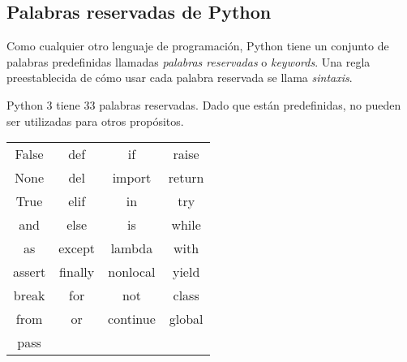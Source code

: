     \subsection{Palabras reservadas de Python}\label{subsubsec: keywords}
    Como cualquier otro lenguaje de programación, Python tiene un conjunto de palabras predefinidas llamadas \emph{palabras reservadas} o \emph{keywords}. Una regla preestablecida de cómo usar cada palabra reservada se llama \emph{sintaxis}.\par 
    Python 3 tiene 33 palabras reservadas. Dado que están predefinidas, no pueden ser utilizadas para otros propósitos. 
    \begin{table}[h]
        \centering
            \begin{tabular}{|c|ccc}
            \hline
            False  & \multicolumn{1}{c|}{def}     & \multicolumn{1}{c|}{if}       & \multicolumn{1}{c|}{raise}  \\
            None   & \multicolumn{1}{c|}{del}     & \multicolumn{1}{c|}{import}   & \multicolumn{1}{c|}{return} \\
            True   & \multicolumn{1}{c|}{elif}    & \multicolumn{1}{c|}{in}       & \multicolumn{1}{c|}{try}    \\
            and    & \multicolumn{1}{c|}{else}    & \multicolumn{1}{c|}{is}       & \multicolumn{1}{c|}{while}  \\
            as     & \multicolumn{1}{c|}{except}  & \multicolumn{1}{c|}{lambda}   & \multicolumn{1}{c|}{with}   \\
            assert & \multicolumn{1}{c|}{finally} & \multicolumn{1}{c|}{nonlocal} & \multicolumn{1}{c|}{yield}  \\
            break  & \multicolumn{1}{c|}{for}     & \multicolumn{1}{c|}{not}      & \multicolumn{1}{c|}{class}  \\
            from   & \multicolumn{1}{c|}{or}      & \multicolumn{1}{c|}{continue} & \multicolumn{1}{c|}{global} \\ \cline{2-4} 
            pass   &                              &                               &                             \\ \cline{1-1}
            \end{tabular}
    \end{table}
